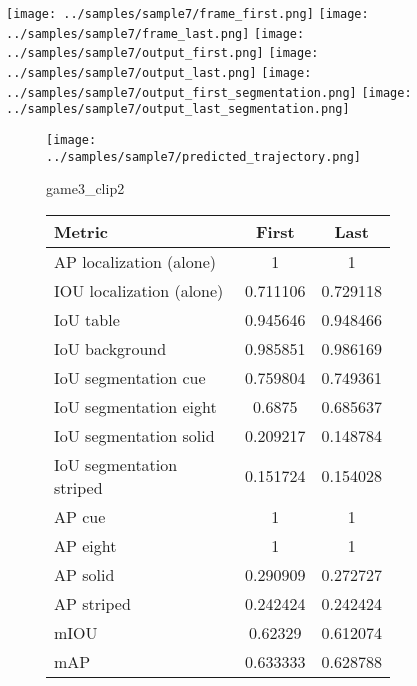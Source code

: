 \begin{figure}
    \texttt{[image: ../samples/sample7/frame\_first.png]}
    \texttt{[image: ../samples/sample7/frame\_last.png]}
    \newline
    \texttt{[image: ../samples/sample7/output\_first.png]}
    \texttt{[image: ../samples/sample7/output\_last.png]}
    \newline
    \texttt{[image: ../samples/sample7/output\_first\_segmentation.png]}
    \texttt{[image: ../samples/sample7/output\_last\_segmentation.png]}
    \newline
    \begin{subfigure}[b]{0.49\textwidth}
        \vspace{20pt}
        \texttt{[image: ../samples/sample7/predicted\_trajectory.png]}
        \caption*{game3\_clip2}
    \end{subfigure}
\begin{subfigure}[b]{0.49\textwidth}
    \begin{tabular}{|l|c|c|}
        \hline
        \textbf{Metric} & \textbf{First} & \textbf{Last} \\
        \hline
        AP localization (alone) & 1 & 1 \\ 
        IOU localization (alone) & 0.711106 & 0.729118 \\ 
        \hline
        IoU table & 0.945646 & 0.948466 \\ 
        IoU background & 0.985851 & 0.986169 \\ 
        \hline
        IoU segmentation cue & 0.759804 & 0.749361 \\ 
        IoU segmentation eight & 0.6875 & 0.685637 \\ 
        IoU segmentation solid & 0.209217 & 0.148784 \\ 
        IoU segmentation striped & 0.151724 & 0.154028 \\ 
        \hline
        AP cue & 1 & 1 \\ 
        AP eight & 1 & 1 \\ 
        AP solid & 0.290909 & 0.272727 \\ 
        AP striped & 0.242424 & 0.242424 \\ 
        \hline
        mIOU & 0.62329 & 0.612074 \\ 
        mAP & 0.633333 & 0.628788 \\ 
        \hline
    \end{tabular}
    
\end{subfigure}
\end{figure}

